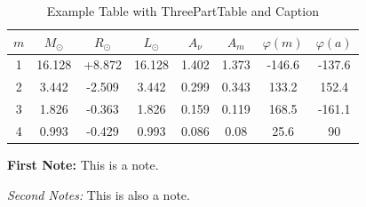 \begin{table}[htbp]
    \centering
    \begin{threeparttable}
        \caption{Example Table with ThreePartTable and Caption
        \label{tab:example-threeparttable}}
        \begin{tabular}{cccccccc}
            \toprule
            {$m$} & {$M_\odot$} & {$R_\odot$} & {$L_\odot$} & {$A_\nu$} & {$A_m$} & {$\varphi(m)$} & {$\varphi(a)$} \\ \midrule
            1  & 16.128 & +8.872 & 16.128 & 1.402 & 1.373 & -146.6 & -137.6 \\
            2  & 3.442  & -2.509 & 3.442  & 0.299 & 0.343 & 133.2  & 152.4  \\ \midrule
            3  & 1.826  & -0.363 & 1.826  & 0.159 & 0.119 & 168.5  & -161.1 \\
            4  & 0.993  & -0.429 & 0.993  & 0.086 & 0.08  & 25.6   & 90     \\ \bottomrule
        \end{tabular}
        \begin{tablenotes}[flushleft]
            \footnotesize
            \item \textbf{First Note:} This is a note.
            \item \textit{Second Notes:} This is also a note.
        \end{tablenotes}
    \end{threeparttable}
\end{table}